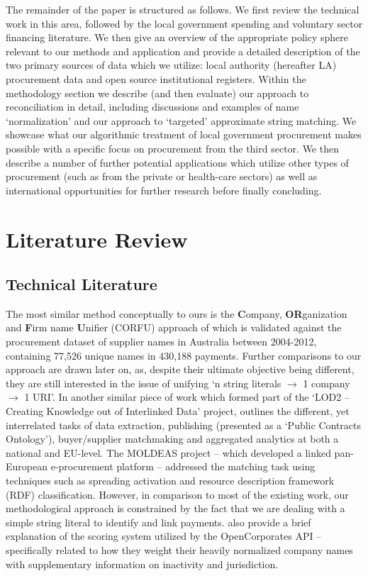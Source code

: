 \documentclass[12pt]{article}
\begin{document}
The remainder of the paper is structured as follows. We first review the technical work in this area, followed by the local government spending and voluntary sector financing literature. We then give an overview of the appropriate policy sphere relevant to our methods and application and provide a detailed description of the two primary sources of data which we utilize: local authority (hereafter LA) procurement data and open source institutional registers. Within the methodology section we describe (and then evaluate) our approach to reconciliation in detail, including discussions and examples of name `normalization' and our approach to `targeted' approximate string matching. We showcase what our algorithmic treatment of local government procurement makes possible with a specific focus on procurement from the third sector. We then describe a number of further potential applications which utilize other types of procurement (such as from the private or health-care sectors) as well as international opportunities for further research before finally concluding.

\section{Literature Review}\label{litreview}

\subsection{Technical Literature}

The most similar method conceptually to ours is the \textbf{C}ompany, \textbf{OR}ganization and \textbf{F}irm name \textbf{U}nifier (CORFU) approach of \cite{corfu2015} which is validated against the procurement dataset of supplier names in Australia between 2004-2012, containing 77,526 unique names in 430,188 payments. Further comparisons to our approach are drawn later on, as, despite their ultimate objective being different, they are still interested in the issue of unifying `n string literals $\rightarrow$ 1 company $\rightarrow$ 1 URI'. In another similar piece of work which formed part of the `LOD2 -- Creating Knowledge out of Interlinked Data’ project, \cite{Svatek2014} outlines the different, yet interrelated tasks of data extraction, publishing (presented as a `Public Contracts Ontology'), buyer/supplier matchmaking and aggregated analytics at both a national and EU-level. The MOLDEAS project -- which developed a linked pan-European e-procurement platform \citep[outlined in][]{moldeas2012} -- addressed the matching task using techniques such as spreading activation and resource description framework (RDF) classification. However, in comparison to most of the existing work, our methodological approach is constrained by the fact that we are dealing with a simple string literal to identify and link payments. \cite{OCref} also provide a brief explanation of the scoring system utilized by the OpenCorporates API -- specifically related to how they weight their heavily normalized company names with supplementary information on inactivity and jurisdiction.
\end{document}
